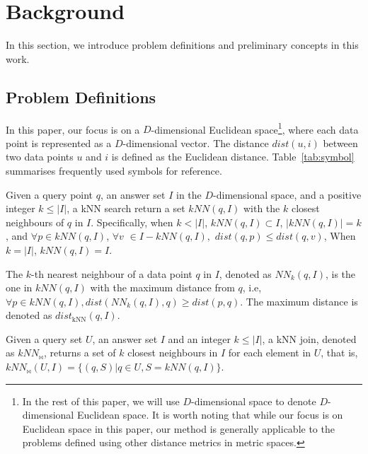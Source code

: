 

\section{Background}\label{sec:background}

In this section, we introduce problem definitions and preliminary concepts in this work.

\subsection{Problem Definitions}\label{subsec:definitions}

In this paper, our focus is on a $D$-dimensional Euclidean space\footnote{In the rest of this paper, we will use $D$-dimensional space to denote $D$-dimensional Euclidean space. It is worth noting that while our focus is on Euclidean space in this paper, our method is generally applicable to the problems defined using other distance metrics in metric spaces.}, where each data point is represented as a $D$-dimensional vector. 
%
The distance $dist(u,i)$ between two data points $u$ and $i$ is defined as the Euclidean distance. Table~\ref{tab:symbol} summarises frequently used symbols for reference.

\begin{definition}\label{def:knn_search}
    Given a query point $q$, an answer set $I$ in the $D$-dimensional space, and a positive integer $k\leq|I|$, a kNN search return a set $kNN(q, I)$ with the $k$ closest neighbours of $q$ in $I$. 
    Specifically, when $k<|I|$, $kNN(q, I)\subset I$, $|kNN(q, I)|=k$, and $\forall p \in kNN(q, I)$, $\forall v$ $\in I-kNN(q, I),$ $dist(q,p)\leq dist(q,v)$, 
    When $k = |I|$, $kNN(q, I) = I$.
\end{definition}

The $k$-th nearest neighbour of a data point $q$ in $I$, denoted as $NN_k(q,I)$, is the one in $kNN(q,I)$ with the maximum distance from $q$, i.e, $\forall p\in kNN(q,I), dist(NN_k(q,I),q)\geq dist(p,q)$. The maximum distance is denoted as $dist_\text{kNN}(q,I)$.

\begin{definition}\label{def:knnj}
    Given a query set $U$, an answer set $I$ and an integer $k\leq|I|$, a kNN join, denoted as $kNN_{\bowtie}$, returns a set of 
    $k$ closest neighbours in $I$ for each element in $U$, that is, $kNN_{\bowtie}(U,I)=\{(q, S)|q\in U, S=kNN(q,I)\}$.

\end{definition}


